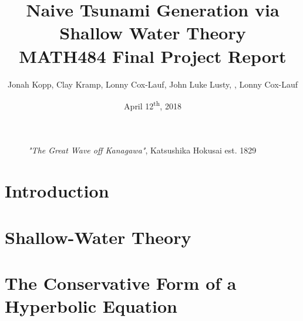 \documentclass[12pt,a4]{article}
\begin{document}
\title{Naive Tsunami Generation via Shallow Water Theory\\
\large  MATH484 Final Project Report}
\author{Jonah Kopp, Clay Kramp, Lonny Cox-Lauf, John Luke Lusty, , Lonny Cox-Lauf}
\date{April 12\textsuperscript{th}, 2018}

\begin{titlepage}
	\maketitle
    \begin{figure}[h]
        \centering
        \caption*{\textit{"The Great Wave off Kanagawa"}, Katsushika Hokusai est. 1829}
    \end{figure}
\end{titlepage}
	
\tableofcontents
\pagebreak

\section{Introduction}


\section{Shallow-Water Theory}


\section{The Conservative Form of a Hyperbolic Equation}

\end{document}
